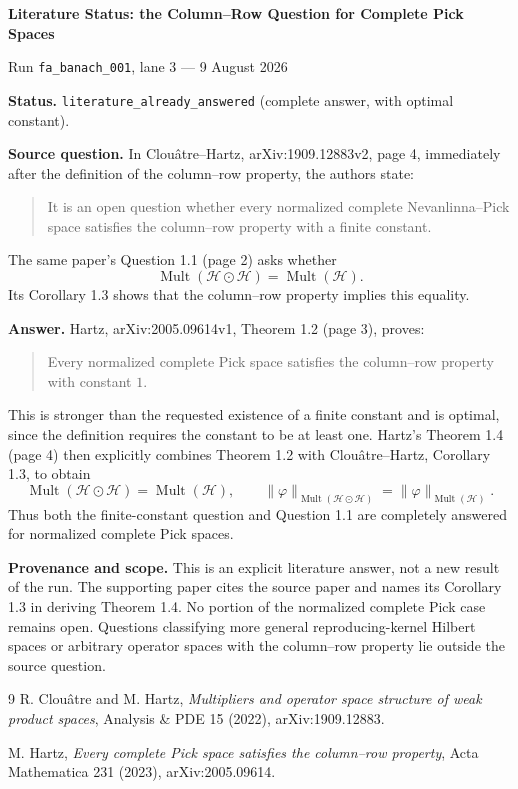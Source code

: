 \documentclass[10pt]{article}
\begin{document}
\begin{center}
  {\Large\bfseries Literature Status: the Column--Row Question for Complete Pick Spaces}\par
  \vspace{0.45em}
  {Run \texttt{fa\_banach\_001}, lane 3 --- 9 August 2026}
\end{center}
\vspace{0.35em}

\textbf{Status.} \texttt{literature\_already\_answered} (complete answer,
with optimal constant).

\textbf{Source question.} In Clou\^atre--Hartz,
arXiv:1909.12883v2, page 4, immediately after the definition of the
column--row property, the authors state:
\begin{quote}
It is an open question whether every normalized complete
Nevanlinna--Pick space satisfies the column--row property with a finite
constant.
\end{quote}
The same paper's Question 1.1 (page 2) asks whether
\[
  \operatorname{Mult}(\mathcal H\odot\mathcal H)
  =\operatorname{Mult}(\mathcal H).
\]
Its Corollary 1.3 shows that the column--row property implies this equality.

\textbf{Answer.} Hartz, arXiv:2005.09614v1, Theorem 1.2 (page 3), proves:
\begin{quote}
Every normalized complete Pick space satisfies the column--row property
with constant $1$.
\end{quote}
This is stronger than the requested existence of a finite constant and is
optimal, since the definition requires the constant to be at least one.
Hartz's Theorem 1.4 (page 4) then explicitly combines Theorem 1.2 with
Clou\^atre--Hartz, Corollary 1.3, to obtain
\[
  \operatorname{Mult}(\mathcal H\odot\mathcal H)
  =\operatorname{Mult}(\mathcal H),
  \qquad
  \|\varphi\|_{\operatorname{Mult}(\mathcal H\odot\mathcal H)}
  =\|\varphi\|_{\operatorname{Mult}(\mathcal H)}.
\]
Thus both the finite-constant question and Question 1.1 are completely answered
for normalized complete Pick spaces.

\textbf{Provenance and scope.} This is an explicit literature answer, not a
new result of the run.  The supporting paper cites the source paper and names
its Corollary 1.3 in deriving Theorem 1.4.  No portion of the normalized
complete Pick case remains open.  Questions classifying more general
reproducing-kernel Hilbert spaces or arbitrary operator spaces with the
column--row property lie outside the source question.

\begin{thebibliography}{9}
R. Clou\^atre and M. Hartz,
\emph{Multipliers and operator space structure of weak product spaces},
Analysis \& PDE 15 (2022), arXiv:1909.12883.

M. Hartz,
\emph{Every complete Pick space satisfies the column--row property},
Acta Mathematica 231 (2023), arXiv:2005.09614.
\end{thebibliography}
\end{document}
